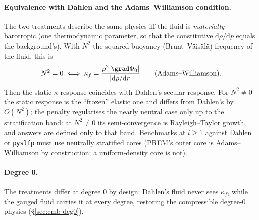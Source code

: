 \documentclass[11pt]{article}
\numberwithin{equation}{section}
\theoremstyle{remark}
\newcommand{\code}[1]{\texttt{#1}}
\begin{document}
\paragraph{Equivalence with Dahlen and the Adams--Williamson condition.}
The two treatments describe the same physics iff the fluid is
\emph{materially} barotropic (one thermodynamic parameter, so that the
constitutive $\mathrm{d}\rho/\mathrm{d}p$ equals the background's). With
$N^2$ the squared buoyancy (Brunt--V\"ais\"al\"a) frequency of the fluid,
this is
\begin{equation}
  N^2 = 0 \iff \kappa_f = \frac{\rho^2|\grad\Phi_0|}{|\mathrm{d}\rho/\mathrm{d}r|}
  \qquad\text{(Adams--Williamson)} .
\end{equation}
Then the static $\kappa$-response coincides with Dahlen's secular
response. For $N^2\neq0$ the static response is the ``frozen'' elastic one
and differs from Dahlen's by $O(N^2)$; the penalty regularises the
nearly neutral case only up to the stratification band: at $N^2\neq0$ its
semi-convergence is Rayleigh--Taylor growth, and answers are defined only to
that band. Benchmarks at $l\ge1$ against Dahlen or \code{pyslfp} must
use neutrally stratified cores (PREM's outer core is Adams--Williamson by
construction; a uniform-density core is not).

\paragraph{Degree 0.} The treatments differ at degree 0 by design: Dahlen's
fluid never sees $\kappa_f$, while the gauged fluid carries it at every
degree, restoring the compressible degree-0 physics
(\S\ref{sec:cmb-deg0}).
\end{document}
